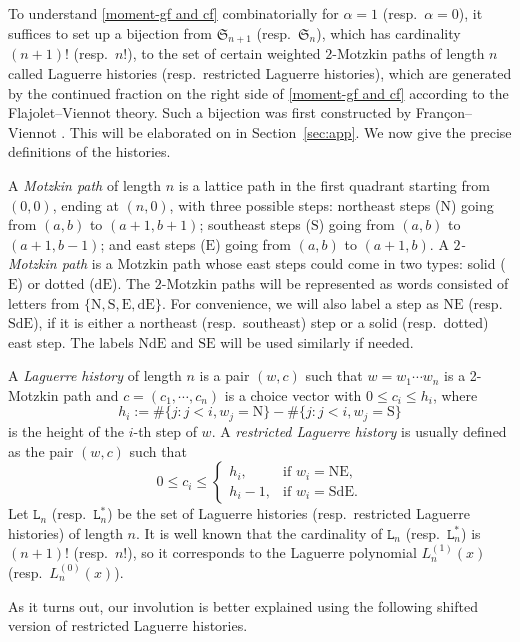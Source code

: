 \documentclass[12pt]{amsart}
\numberwithin{equation}{section}
\theoremstyle{plain}
\theoremstyle{definition}
\def\SS{\mathfrak{S}}
\def\N{\mathrm{N}}
\def\S{\mathrm{S}}
\def\E{\mathrm{E}}
\def\dE{\mathrm{dE}}
\def\NE{\mathrm{NE}}
\def\SE{\mathrm{SE}}
\def\SdE{\mathrm{SdE}}
\def\NdE{\mathrm{NdE}}
\begin{document}
To understand \eqref{moment-gf and cf} combinatorially for $\alpha=1$ (resp.~$\alpha=0$), it suffices to set up a bijection from $\SS_{n+1}$ (resp.~$\SS_n$), which has cardinality $(n+1)!$ (resp.~$n!$), to the set of certain weighted $2$-Motzkin paths of length $n$ called Laguerre histories (resp.~restricted Laguerre histories), which are generated by the continued fraction on the right side of \eqref{moment-gf and cf} according to the Flajolet--Viennot theory. Such a bijection was first constructed by Fran\c con--Viennot \cite{FV}. This will be elaborated on in Section~\ref{sec:app}. We now give the precise definitions of the histories.

A {\em Motzkin path} of length $n$ is a lattice path in the first quadrant starting from $(0,0)$, ending at $(n,0)$, with three possible steps: northeast steps ($\N$) going from $(a,b)$ to $(a+1,b+1)$; southeast steps ($\S$) going from $(a,b)$ to $(a+1,b-1)$; and east steps ($\E$) going from $(a,b)$ to $(a+1,b)$. A {\em $2$-Motzkin path} is a Motzkin path whose east steps could come in two types: solid ($\E$) or dotted ($\dE$). The $2$-Motzkin paths will be represented as words consisted of letters from $\{\N,\S,\E,\dE\}$. For convenience, we will also label a step as $\NE$ (resp.~$\SdE$), if it is either a northeast (resp.~southeast) step or a solid (resp.~dotted) east step. The labels $\NdE$ and $\SE$ will be used similarly if needed.

A {\em Laguerre history}  of length $n$ is a pair $(w,c)$ such that
$w=w_1 \cdots w_n$ is a 2-Motzkin path and $c=(c_1,\cdots, c_n)$
is a choice vector with $0 \leq c_i \leq h_i$, where
\[h_i := \#\{j : j<i, w_j=\N\}-\#\{j : j<i, w_j=\S\}\]
is the height of the $i$-th step of $w$.
A {\em restricted  Laguerre history} is usually defined as
the pair $(w,c)$ such that
$$0 \leq  c_i \leq \begin{cases}
  h_i, & \text{if } w_i=\NE,\\
  h_i-1, & \text{if } w_i=\SdE.
  \end{cases}$$
Let $\mathtt{L}_n$ (resp.~$\mathtt{L}_n^*$) be the set of
Laguerre histories (resp.~restricted Laguerre histories) of length $n$.
It is well known that
the cardinality of $\mathtt{L}_n$ (resp.~$\mathtt{L}_n^*$) is $(n+1)!$ (resp.~$n!$), so it corresponds to the Laguerre polynomial $L_n^{(1)}(x)$ (resp.~$L_n^{(0)}(x)$).

As it turns out, our involution is better explained using the following shifted version of restricted Laguerre histories.
\end{document}
